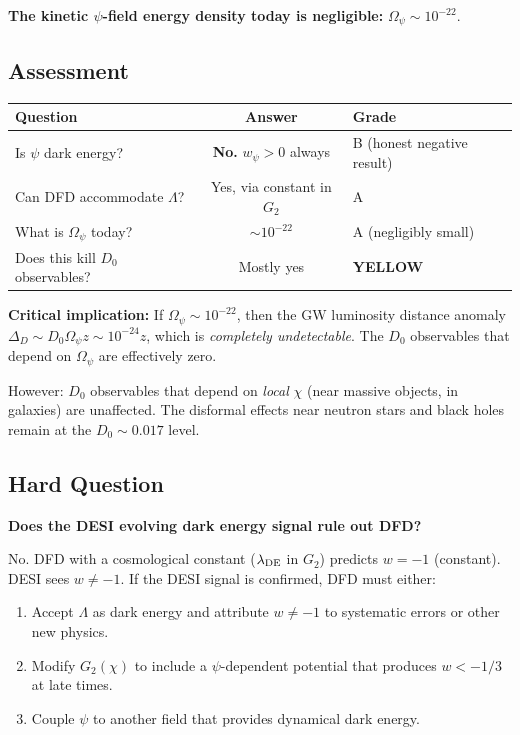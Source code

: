 \documentclass[11pt,a4paper]{article}
\newcommand{\YELLOW}{\textcolor{dfdyellow}{\textbf{YELLOW}}}
\begin{document}
\textbf{The kinetic $\psi$-field energy density today is negligible:} $\Omega_\psi \sim 10^{-22}$.

\subsection{Assessment}

\begin{center}
\begin{tabular}{lcl}
\toprule
\textbf{Question} & \textbf{Answer} & \textbf{Grade} \\
\midrule
Is $\psi$ dark energy? & \textbf{No.} $w_\psi > 0$ always & B (honest negative result) \\
Can DFD accommodate $\Lambda$? & Yes, via constant in $G_2$ & A \\
What is $\Omega_\psi$ today? & $\sim 10^{-22}$ & A (negligibly small) \\
Does this kill $D_0$ observables? & Mostly yes & \YELLOW \\
\bottomrule
\end{tabular}
\end{center}

\textbf{Critical implication:} If $\Omega_\psi \sim 10^{-22}$, then the GW luminosity distance anomaly $\Delta_D \sim D_0 \Omega_\psi z \sim 10^{-24} z$, which is \emph{completely undetectable}. The $D_0$ observables that depend on $\Omega_\psi$ are effectively zero.

However: $D_0$ observables that depend on \emph{local} $\chi$ (near massive objects, in galaxies) are unaffected. The disformal effects near neutron stars and black holes remain at the $D_0 \sim 0.017$ level.

\subsection{Hard Question}

\textbf{Does the DESI evolving dark energy signal rule out DFD?}

No. DFD with a cosmological constant ($\lambda_{\rm DE}$ in $G_2$) predicts $w = -1$ (constant). DESI sees $w \neq -1$. If the DESI signal is confirmed, DFD must either:
\begin{enumerate}
\item Accept $\Lambda$ as dark energy and attribute $w \neq -1$ to systematic errors or other new physics.
\item Modify $G_2(\chi)$ to include a $\psi$-dependent potential that produces $w < -1/3$ at late times.
\item Couple $\psi$ to another field that provides dynamical dark energy.
\end{enumerate}
\end{document}
